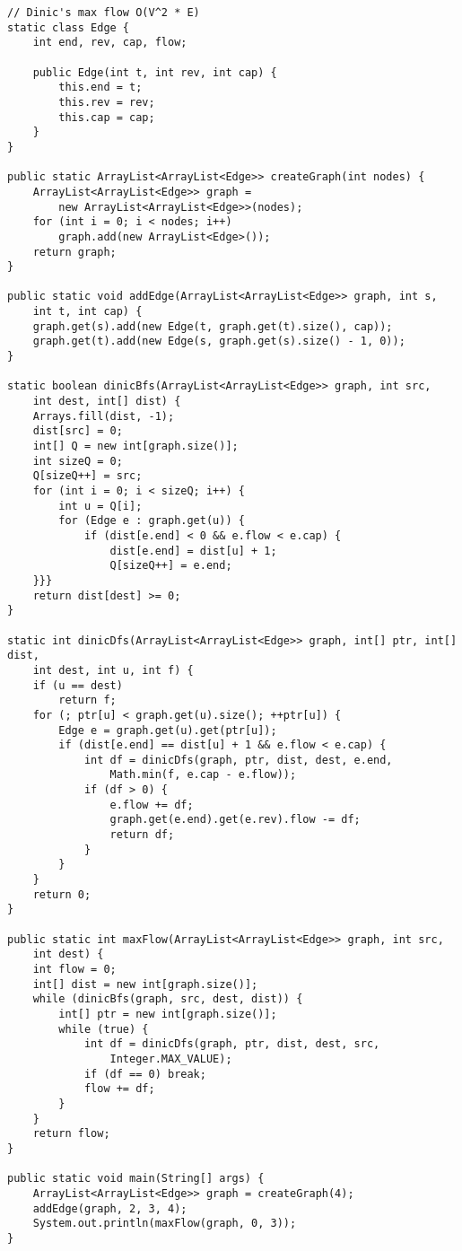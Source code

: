 \begin{verbatim}
// Dinic's max flow O(V^2 * E)
static class Edge {
	int end, rev, cap, flow;

	public Edge(int t, int rev, int cap) {
		this.end = t;
		this.rev = rev;
		this.cap = cap;
	}
}

public static ArrayList<ArrayList<Edge>> createGraph(int nodes) {
	ArrayList<ArrayList<Edge>> graph = 
		new ArrayList<ArrayList<Edge>>(nodes);
	for (int i = 0; i < nodes; i++)
		graph.add(new ArrayList<Edge>());
	return graph;
}

public static void addEdge(ArrayList<ArrayList<Edge>> graph, int s,
	int t, int cap) {
	graph.get(s).add(new Edge(t, graph.get(t).size(), cap));
	graph.get(t).add(new Edge(s, graph.get(s).size() - 1, 0));
}

static boolean dinicBfs(ArrayList<ArrayList<Edge>> graph, int src, 
	int dest, int[] dist) {
	Arrays.fill(dist, -1);
	dist[src] = 0;
	int[] Q = new int[graph.size()];
	int sizeQ = 0;
	Q[sizeQ++] = src;
	for (int i = 0; i < sizeQ; i++) {
		int u = Q[i];
		for (Edge e : graph.get(u)) {
			if (dist[e.end] < 0 && e.flow < e.cap) {
				dist[e.end] = dist[u] + 1;
				Q[sizeQ++] = e.end;
	}}}
	return dist[dest] >= 0;
}

static int dinicDfs(ArrayList<ArrayList<Edge>> graph, int[] ptr, int[] dist, 
	int dest, int u, int f) {
	if (u == dest)
		return f;
	for (; ptr[u] < graph.get(u).size(); ++ptr[u]) {
		Edge e = graph.get(u).get(ptr[u]);
		if (dist[e.end] == dist[u] + 1 && e.flow < e.cap) {
			int df = dinicDfs(graph, ptr, dist, dest, e.end,
            	Math.min(f, e.cap - e.flow));
			if (df > 0) {
				e.flow += df;
				graph.get(e.end).get(e.rev).flow -= df;
				return df;
			}
		}
	}
	return 0;
}

public static int maxFlow(ArrayList<ArrayList<Edge>> graph, int src,
	int dest) {
	int flow = 0;
	int[] dist = new int[graph.size()];
	while (dinicBfs(graph, src, dest, dist)) {
		int[] ptr = new int[graph.size()];
		while (true) {
			int df = dinicDfs(graph, ptr, dist, dest, src,
				Integer.MAX_VALUE);
			if (df == 0) break;
			flow += df;
		}
	}
	return flow;
}

public static void main(String[] args) {
	ArrayList<ArrayList<Edge>> graph = createGraph(4);
	addEdge(graph, 2, 3, 4);
	System.out.println(maxFlow(graph, 0, 3));
}
\end{verbatim}